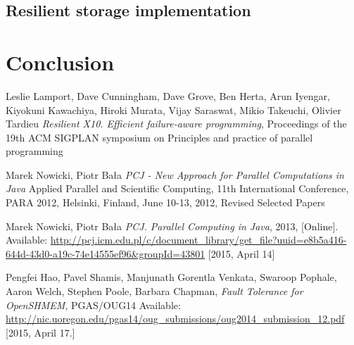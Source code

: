 \documentclass{llncs}
\begin{document}
\subsection{Resilient storage implementation}

\section{Conclusion}

\begin{thebibliography}{1}

Leslie Lamport, Dave Cunningham, Dave Grove, Ben Herta, Arun Iyengar, Kiyokuni Kawachiya, Hiroki Murata, Vijay Saraswat, Mikio Takeuchi, Olivier Tardieu
\emph{Resilient X10. Efficient failure-aware programming},
Proceedings of the 19th ACM SIGPLAN symposium on Principles and practice of parallel programming

Marek Nowicki, Piotr Bała
\emph{PCJ - New Approach for Parallel Computations in Java}
Applied Parallel and Scientific Computing, 11th International Conference, PARA 2012, Helsinki, Finland, June 10-13, 2012, Revised Selected Papers

Marek Nowicki, Piotr Bała
\emph{PCJ. Parallel Computing in Java}, 2013, [Online]. Available: \url{http://pcj.icm.edu.pl/c/document_library/get_file?uuid=e8b5a416-644d-43d0-a19c-74e14555ef96&groupId=43801} [2015, April 14]

Pengfei Hao, Pavel Shamis, Manjunath Gorentla Venkata, Swaroop Pophale, Aaron Welch, Stephen Poole, Barbara Chapman, \emph{Fault Tolerance for OpenSHMEM}, PGAS/OUG14
Available: \url{http://nic.uoregon.edu/pgas14/oug_submissions/oug2014_submission_12.pdf} [2015, April 17.]

\end{thebibliography}
\end{document}
